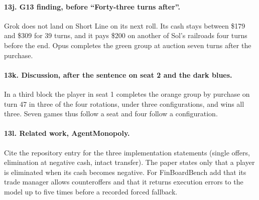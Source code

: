\paragraph{13j. G13 finding, before ``Forty-three turns after''.} Grok does not land on Short Line on its next roll. Its cash stays between \$179 and \$309 for 39 turns, and it pays \$200 on another of Sol's railroads four turns before the end. Opus completes the green group at auction seven turns after the purchase.

\paragraph{13k. Discussion, after the sentence on seat 2 and the dark blues.} In a third block the player in seat 1 completes the orange group by purchase on turn 47 in three of the four rotations, under three configurations, and wins all three. Seven games thus follow a seat and four follow a configuration.

\paragraph{13l. Related work, AgentMonopoly.} Cite the repository entry for the three implementation statements (single offers, elimination at negative cash, intact transfer). The paper states only that a player is eliminated when its cash becomes negative. For FinBoardBench add that its trade manager allows counteroffers and that it returns execution errors to the model up to five times before a recorded forced fallback.
